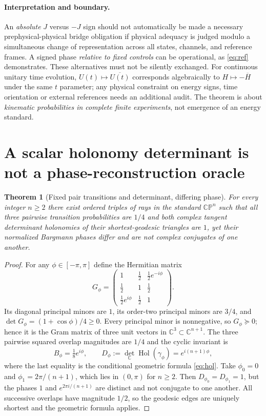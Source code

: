 \documentclass[11pt,a4paper]{article}
\newtheorem{theorem}{Theorem}
\newcommand{\CP}{\mathbb{CP}}
\newcommand{\Hol}{\operatorname{Hol}}
\begin{document}
\paragraph{Interpretation and boundary.} An \emph{absolute} $J$ versus $-J$ sign should not automatically be made a necessary prephysical-physical bridge obligation if physical adequacy is judged modulo a simultaneous change of representation across all states, channels, and reference frames. A signed phase \emph{relative to fixed controls} can be operational, as \eqref{eq:ref} demonstrates. These alternatives must not be silently exchanged. For continuous unitary time evolution, $U(t)\mapsto\overline{U(t)}$ corresponds algebraically to $H\mapsto-\overline H$ under the same $t$ parameter; any physical constraint on energy signs, time orientation or external references needs an additional audit. The theorem is about \emph{kinematic probabilities in complete finite experiments}, not emergence of an energy standard.

\section{A scalar holonomy determinant is not a phase-reconstruction oracle}
\begin{theorem}[Fixed pair transitions and determinant, differing phase]\label{thm:root}
For every integer $n\ge2$ there exist ordered triples of rays in the standard $\CP^n$ such that all three pairwise transition probabilities are $1/4$ and both complex tangent determinant holonomies of their shortest-geodesic triangles are $1$, yet their normalized Bargmann phases differ and are not complex conjugates of one another.
\end{theorem}
\begin{proof}
For any $\phi\in[-\pi,\pi]$ define the Hermitian matrix
\begin{equation}\label{eq:gram}
G_{\phi}=\begin{pmatrix}
1&\tfrac12&\tfrac12e^{-i\phi}\\
\tfrac12&1&\tfrac12\\
\tfrac12e^{i\phi}&\tfrac12&1
\end{pmatrix}.
\end{equation}
Its diagonal principal minors are $1$, its order-two principal minors are $3/4$, and
$\det G_{\phi}=(1+\cos\phi)/4\ge0$. Every principal minor is nonnegative, so $G_\phi\succeq0$; hence it is the Gram matrix of three unit vectors in $\mathbb C^3\subset\mathbb C^{n+1}$. The three pairwise squared overlap magnitudes are $1/4$ and the cyclic invariant is
\begin{equation}\label{eq:branch}
B_\phi=\tfrac18e^{i\phi},\qquad
D_\phi:=\det_{\mathbb C}\Hol(\gamma_\phi)=e^{i(n+1)\phi},
\end{equation}
where the last equality is the conditional geometric formula \eqref{eq:hol}. Take $\phi_0=0$ and $\phi_1=2\pi/(n+1)$, which lies in $(0,\pi)$ for $n\ge2$. Then $D_{\phi_0}=D_{\phi_1}=1$, but the phases $1$ and $e^{2\pi i/(n+1)}$ are distinct and not conjugate to one another. All successive overlaps have magnitude $1/2$, so the geodesic edges are uniquely shortest and the geometric formula applies.
\end{proof}
\end{document}

